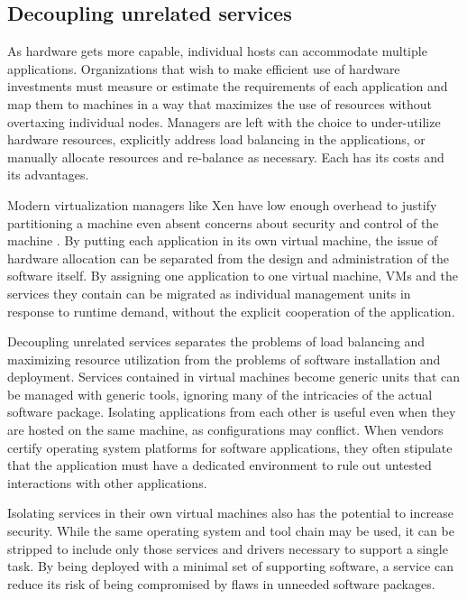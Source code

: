 \subsection{Decoupling unrelated services}

As hardware gets more capable, individual hosts can accommodate multiple applications. Organizations that wish to make efficient use of hardware investments must measure or estimate the requirements of each application and map them to machines in a way that maximizes the use of resources without overtaxing individual nodes. Managers are left with the choice to under-utilize hardware resources, explicitly address load balancing in the applications, or manually allocate resources and re-balance as necessary. Each has its costs and its advantages.

Modern virtualization managers like Xen have low enough overhead to justify partitioning a machine even absent concerns about security and control of the machine \cite{barham}. By putting each application in its own virtual machine, the issue of hardware allocation can be separated from the design and administration of the software itself. By assigning one application to one virtual machine, VMs and the services they contain can be migrated as individual management units in response to runtime demand, without the explicit cooperation of the application.

Decoupling unrelated services separates the problems of load balancing and maximizing resource utilization from the problems of software installation and deployment. Services contained in virtual machines become generic units that can be managed with generic tools, ignoring many of the intricacies of the actual software package. Isolating applications from each other is useful even when they are hosted on the same machine, as configurations may conflict. When vendors certify operating system platforms for software applications, they often stipulate that the application must have a dedicated environment to rule out untested interactions with other applications.

Isolating services in their own virtual machines also has the potential to increase security. While the same operating system and tool chain may be used, it can be stripped to include only those services and drivers necessary to support a single task. By being deployed with a minimal set of supporting software, a service can reduce its risk of being compromised by flaws in unneeded software packages.

